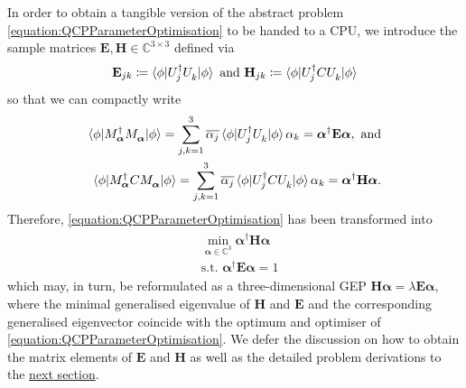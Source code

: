 \documentclass[10pt,conference]{IEEEtran}
\newcommand*{\C}{\mathbb{C}}          %
\begin{document}
In order to obtain a tangible version of the abstract problem \eqref{equation:QCPParameterOptimisation} to be handed to a CPU, we introduce the sample matrices $\mathbf{E}, \mathbf{H} \in \C^{3 \times 3}$ defined via
\begin{align}\label{equation:SampleMatrices}
    \mathbf{E}_{j k} \coloneqq \braket{\phi | U_{j}^{\dagger} U_{k}^{\vphantom{\dagger}} | \phi}\ \text{and}\ \mathbf{H}_{j k} \coloneqq \braket{\phi | U_{j}^{\dagger} C U_{k}^{\vphantom{\dagger}} | \phi}
\end{align}
so that we can compactly write
\begin{align}
    \braket{\phi | M_{\bm{\alpha}}^{\dagger} M_{\bm{\alpha}}^{\vphantom{\dagger}} | \phi} = \sum_{j, k = 1}^{3} \overline{\alpha_{j}} \braket{\phi | U_{j}^{\dagger} U_{k}^{\vphantom{\dagger}} | \phi} \alpha_{k} = \bm{\alpha}^{\dagger} \mathbf{E} \bm{\alpha}, \label{equation:SampleMatricesIdentity1}\ \text{and}\\
    \braket{\phi | M_{\bm{\alpha}}^{\dagger} C M_{\bm{\alpha}}^{\vphantom{\dagger}} | \phi} = \sum_{j, k = 1}^{3} \overline{\alpha_{j}} \braket{\phi | U_{j}^{\dagger} C U_{k}^{\vphantom{\dagger}} | \phi} \alpha_{k} = \bm{\alpha}^{\dagger} \mathbf{H} \bm{\alpha}. \label{equation:SampleMatricesIdentity2}
\end{align}
Therefore, \eqref{equation:QCPParameterOptimisation} has been transformed into
\begin{align}\label{equation:QCPMatrixParameterOptimisation}
    \begin{split}
        &\min_{\bm{\alpha} \in \C^{3}} \bm{\alpha}^{\dagger} \mathbf{H} \bm{\alpha} \\
        &\text{s.t. } \bm{\alpha}^{\dagger} \mathbf{E} \bm{\alpha} = 1
    \end{split}
\end{align}
which may, in turn, be reformulated as a three-dimensional GEP $\mathbf{H} \bm{\alpha} = \lambda \mathbf{E} \bm{\alpha}$, where the minimal generalised eigenvalue of $\mathbf{H}$ and $\mathbf{E}$ and the corresponding generalised eigenvector coincide with the optimum and optimiser of \eqref{equation:QCPParameterOptimisation}.
We defer the discussion on how to obtain the matrix elements of $\mathbf{E}$ and $\mathbf{H}$ as well as the detailed problem derivations to the \hyperref[section:Framework]{next section}.
\end{document}
